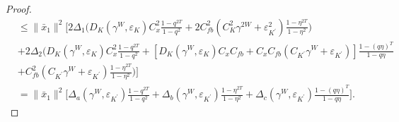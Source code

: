 \documentclass[letterpaper, 10 pt, conference]{ieeeconf}  %
\begin{document}
\begin{proof}
\begin{align*}
    &\leq \|\bar{x}_{1}\|^{2}\bigg[ 2\Delta_{1}\bigg(D_{K}(\gamma^{W},\varepsilon_{K})C_{x}^{2}\frac{1-q^{2T}}{1-q^{2}} + 2C_{fb}^{2}(C_{K}^{2}\gamma^{2W}+\varepsilon_{K^{'}}^{2})\frac{1-\eta^{2T}}{1-\eta^{2}} \bigg)\\
    &+2\Delta_{2}\bigg(D_{K}(\gamma^{W},\varepsilon_{K})C_{x}^{2}\frac{1-q^{2T}}{1-q^{2}}+[D_{K}(\gamma^{W},\varepsilon_{K})C_{x}C_{fb}+C_{x}C_{fb}(C_{K^{'}}\gamma^{W}+\varepsilon_{K^{'}})]\frac{1-(q\eta)^{T}}{1-q\eta}\\
    &+ C_{fb}^{2}(C_{K^{'}}\gamma^{W}+\varepsilon_{K^{'}})\frac{1-\eta^{2T}}{1-\eta^{2}} \bigg)\bigg]\\
    &= \|\bar{x}_{1}\|^{2}\bigg[\Delta_{a}(\gamma^{W},\varepsilon_{K^{'}})\frac{1-q^{2T}}{1-q^{2}} +  \Delta_{b}(\gamma^{W},\varepsilon_{K^{'}})\frac{1-\eta^{2T}}{1-\eta^{2}}+ \Delta_{c}(\gamma^{W},\varepsilon_{K^{'}})\frac{1-(q\eta)^{T}}{1-q\eta}\bigg].
\end{align*}
\end{proof}
\end{document}
